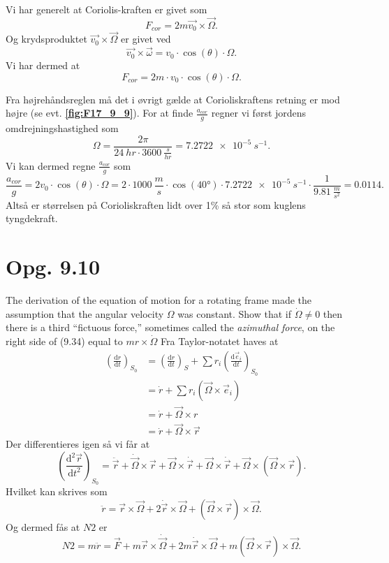 \documentclass[12pt]{article}
\theoremstyle{definition}
\begin{document}
Vi har generelt at Coriolis-kraften er givet som
\[ 
F_{cor} = 2m \Vec{v_0} \times \Vec{\Omega}
.\]
Og krydsproduktet $\Vec{v_0} \times \Vec{\Omega}$ er givet ved
\[ 
\Vec{v_0} \times \Vec{\omega} = v_0 \cdot \cos(\theta) \cdot \Omega
.\]
Vi har dermed at
\[ 
F_{cor} = 2m \cdot v_0 \cdot \cos(\theta) \cdot \Omega
.\]

Fra højrehåndsreglen må det i øvrigt gælde at Corioliskraftens retning er mod højre (se evt. \textbf{\autoref{fig:F17_9_9}}). For at finde $\frac{a_{cor}}{g}$ regner vi først jordens omdrejningshastighed som
\[ 
\Omega = \frac{2 \pi}{\qty{24}{hr} \cdot \qty{3600}{\frac{s}{hr}}} = \qty{7,2722e-5}{s^{-1}} 
.\]
Vi kan dermed regne $\frac{a_{cor}}{g}$ som
\[ 
\frac{a_{cor}}{g} = 2v_0 \cdot \cos(\theta) \cdot \Omega = 2\cdot \qty{1000}{\frac{m}{s}} \cdot \cos(\ang{40}) \cdot \qty{7,2722e-5}{s^{-1}} \cdot \frac{1}{\qty{9,81}{\frac{m}{s^2}}} = \num{0,0114} 
.\]
Altså er størrelsen på Corioliskraften lidt over 1\% så stor som kuglens tyngdekraft.


\section*{Opg. 9.10}
The derivation of the equation of motion for a rotating frame made the assumption that the angular velocity $\Omega$ was constant. Show that if $\dot{\Omega} \neq 0$ then there is a third ``fictuous force,'' sometimes called the \textit{azimuthal force}, on the right side of (9.34) equal to $mr \times \dot{\Omega}$
\bigbreak
Fra Taylor-notatet haves at
\begin{align*}
  \left( \frac{\mathrm{d}r}{\mathrm{d}t}  \right)_{S_0} &= \left( \frac{\mathrm{d}r}{\mathrm{d}t}  \right)_S + \sum r_i \left( \frac{\mathrm{d} \Vec{e}_i}{\mathrm{d}t}  \right)_{S_0} \\
  &= \dot{r} + \sum r_i(\Vec{\Omega} \times \Vec{e}_i)  \\
  &= \dot{r} + \Vec{\Omega} \times r \\
  &= \dot{r} + \Vec{\Omega} \times \Vec{r}
\end{align*}
Der differentieres igen så vi får at
\[
\left( \frac{\mathrm{d}^2 \Vec{r}}{\mathrm{d}t^2}  \right)_{S_0} = \ddot{\Vec{r}} + \dot{\Vec{\Omega}} \times \Vec{r} + \Vec{\Omega} \times \dot{\Vec{r}} + \Vec{\Omega} \times \dot{\Vec{r}} + \Vec{\Omega} \times (\Vec{\Omega} \times \Vec{r})
.\]
Hvilket kan skrives som
\[ 
  \ddot{r} = \Vec{r} \times \Vec{\Omega} + 2\dot{\Vec{r}} \times \Vec{\Omega} + \left( {\Vec{\Omega}} \times \Vec{r} \right) \times \Vec{\Omega}
.\]
Og dermed fås at $N2$ er
\[ 
  N2 = m \ddot{r} = \Vec{F} + m \Vec{r} \times \dot{\Vec{\Omega}} + 2m \dot{\Vec{r}} \times \Vec{\Omega} + m \left( \Vec{\Omega} \times \Vec{r} \right) \times \Vec{\Omega}
.\]
\end{document}

